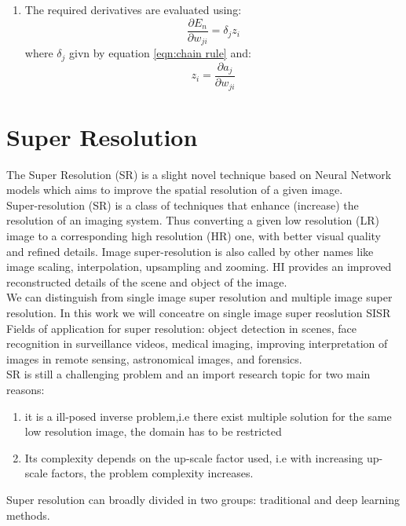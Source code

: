 \documentclass[a4paper, 10pt]{book}
\begin{document}
\begin{enumerate}
\item	The required derivatives are evaluated using:
   \begin{equation}
       \label{eqn:deriv_costfunc_w}
   \frac{\partial E_n}{\partial w_{ji}} = \delta_j z_i
   \end{equation}  
   where $\delta_j$ givn by equation \ref{eqn:chain rule} and:
   \begin{equation}
       \label{eqn:z_i}
     z_i= \frac{\partial a_j}{\partial w_{ji}  }
\end{equation}
\end{enumerate}

\newpage
\section{Super Resolution}

The Super Resolution (SR) is a slight novel technique based on Neural Network models which aims to improve the spatial resolution of a given image.
\\
Super-resolution  (SR) is a class of techniques that enhance (increase) the resolution of an imaging system. Thus converting a given low resolution (LR) image to a corresponding high resolution (HR) one, with better visual quality and refined details.
Image super-resolution is also called by other names like image scaling, interpolation, upsampling and zooming.
HI provides an improved reconstructed details of the scene and object of the image.
\\
We can distinguish from single image super resolution and multiple image super resolution. In this work we will conceatre on single image super reoslution SISR
\\
Fields of application for super resolution:
object detection in scenes, face recognition in surveillance videos, medical imaging, improving interpretation of images in remote sensing, astronomical images, and forensics.
\\
SR is  still a challenging problem and an import research topic for two main reasons:
\begin{enumerate}
\item it is a ill-posed inverse problem,i.e there exist multiple solution for the same low resolution image, the domain has to be restricted 
\item Its complexity depends on the up-scale factor used, i.e with increasing up-scale factors, the problem complexity increases.
\end{enumerate}
Super resolution can broadly divided in two groups:
traditional  and deep learning methods\cite{https://doi.org/10.48550/arxiv.1904.07523}.
\end{document}
